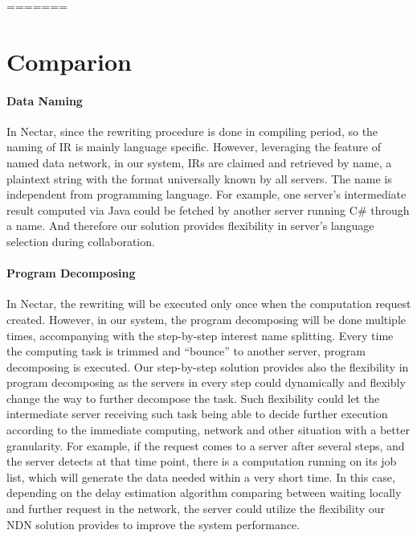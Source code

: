 =======
\section{Comparion}
 
\paragraph{Data Naming}
In Nectar, since the rewriting procedure is done in compiling period, so the naming of IR is mainly language specific. However, leveraging the feature of named data network, in our system, IRs are claimed and retrieved by name, a plaintext string with the format universally known by all servers. The name is independent from programming language. For example, one server’s intermediate result computed via Java could be fetched by another server running C\# through a name. And therefore our solution provides flexibility in server’s language selection during collaboration.
 
\paragraph{Program Decomposing}
In Nectar, the rewriting will be executed only once when the computation request created. However, in our system, the program decomposing will be done multiple times, accompanying with the step-by-step interest name splitting.  Every time the computing task is trimmed and “bounce” to another server, program decomposing is executed. Our step-by-step solution provides also the flexibility in program decomposing as the servers in every step could dynamically and flexibly change the way to further decompose the task. Such flexibility could let the intermediate server receiving such task being able to decide further execution according to the immediate computing, network and other situation with a better granularity. For example, if the request comes to a server after several steps, and the server detects at that time point, there is a computation running on its job list, which will generate the data needed within a very short time. In this case, depending on the delay estimation algorithm comparing between waiting locally and further request in the network, the server could utilize the flexibility our NDN solution provides to improve the system performance.
 
